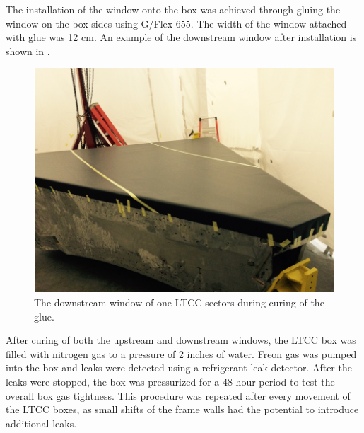 The installation of the window onto the box was achieved through gluing the window on the box sides using G/Flex 655. The width of the window
attached with glue was 12 cm.
An example of the downstream window after installation is shown in .

\begin{figure}
	\centering
	\includegraphics[width=1.0\columnwidth,keepaspectratio]{img/downstreamWindow.png}
	\caption{The downstream window of one LTCC sectors during curing of the glue. }
	\label{fig:downstreamWindow}
\end{figure}

After curing of both the upstream and downstream windows, the LTCC box was filled with nitrogen gas to a pressure of 2 inches of water.
Freon gas was pumped into the box and leaks were detected using a refrigerant leak detector. After the leaks were stopped, the box was pressurized
for a 48 hour period to test the overall box gas tightness. This procedure was repeated after every movement of the LTCC boxes, as small
shifts of the frame walls had the potential to introduce additional leaks.


